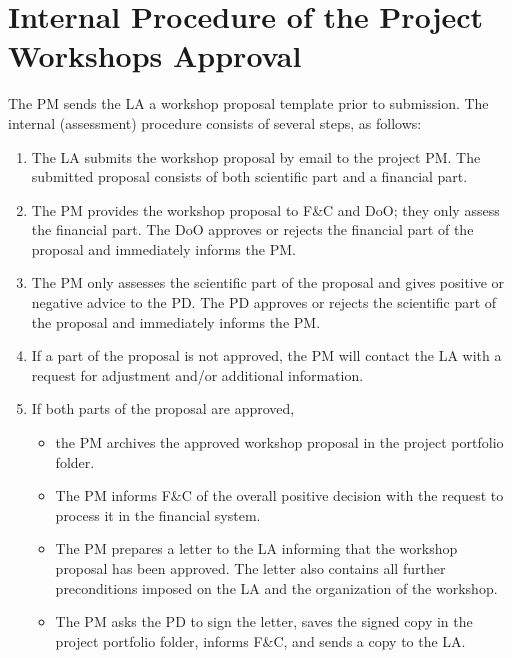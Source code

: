 
\section{Internal Procedure of the Project Workshops Approval}
\label{app:workshops}

The PM sends the LA a workshop proposal template prior to submission. The internal (assessment) procedure consists of
several steps, as follows:
\begin{enumerate}
\item The LA submits the workshop proposal by email to the project PM. The submitted proposal consists of both scientific part
and a financial part.
\item The PM provides the workshop proposal to F\&C and DoO; they only assess the financial part. The DoO approves or rejects
the financial part of the proposal and immediately informs the PM.
\item The PM only assesses the scientific part of the proposal and gives positive or negative advice to the PD. The PD
approves or rejects the scientific part of the proposal and immediately informs the PM.
\item If a part of the proposal is not approved, the PM will contact the LA with a request for adjustment and/or additional
information.
\item If both parts of the proposal are approved,
\begin{itemize}
\item the PM archives the approved workshop proposal in the project portfolio folder.
\item The PM informs F\&C of the overall positive decision with the request to process it in the financial system.
\item The PM prepares a letter to the LA informing that the workshop proposal has been approved. The letter also contains all
further preconditions imposed on the LA and the organization of the workshop.
\item The PM asks the PD to sign the letter, saves the signed copy in the project portfolio folder, informs F\&C, and sends a
copy to the LA.
\end{itemize}
\end{enumerate}